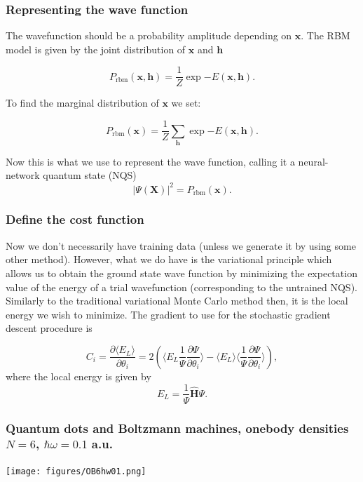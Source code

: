 \documentclass{beamer}
\begin{document}
\begin{frame}
\frametitle{Representing the wave function}

The wavefunction should be a probability amplitude depending on
 $\bm{x}$. The RBM model is given by the joint distribution of
 $\bm{x}$ and $\bm{h}$

\[
        P_{\mathrm{rbm}}(\bm{x},\bm{h}) = \frac{1}{Z} \exp{-E(\bm{x},\bm{h})}.
\]

To find the marginal distribution of $\bm{x}$ we set:

\[
        P_{\mathrm{rbm}}(\bm{x}) =\frac{1}{Z}\sum_{\bm{h}} \exp{-E(\bm{x}, \bm{h})}.
\]

Now this is what we use to represent the wave function, calling it a neural-network quantum state (NQS)
\[
        \vert\Psi (\bm{X})\vert^2 = P_{\mathrm{rbm}}(\bm{x}).
\]
\end{frame}

\begin{frame}
\frametitle{Define the cost function}

Now we don't necessarily have training data (unless we generate it by
using some other method). However, what we do have is the variational
principle which allows us to obtain the ground state wave function by
minimizing the expectation value of the energy of a trial wavefunction
(corresponding to the untrained NQS). Similarly to the traditional
variational Monte Carlo method then, it is the local energy we wish to
minimize. The gradient to use for the stochastic gradient descent
procedure is

\[
	C_i = \frac{\partial \langle E_L \rangle}{\partial \theta_i}
	= 2(\langle E_L \frac{1}{\Psi}\frac{\partial \Psi}{\partial \theta_i} \rangle - \langle E_L \rangle \langle \frac{1}{\Psi}\frac{\partial \Psi}{\partial \theta_i} \rangle ),
\]
where the local energy is given by
\[
	E_L = \frac{1}{\Psi} \hat{\bm{H}} \Psi.
\]
\end{frame}

\begin{frame}
\frametitle{Quantum dots and Boltzmann machines, onebody densities $N=6$, $\hbar\omega=0.1$ a.u.}

\begin{block}{}

\vspace{6mm}

\centerline{\texttt{[image: figures/OB6hw01.png]}}

\vspace{6mm}

\end{block}
\end{frame}
\end{document}
